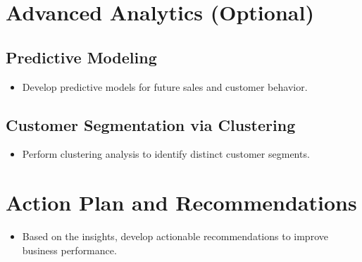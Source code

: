 \documentclass{article}
\begin{document}
\section{Advanced Analytics (Optional)}
    \subsection{Predictive Modeling}
    \begin{itemize}
        \item Develop predictive models for future sales and customer behavior.
    \end{itemize}
    
    \subsection{Customer Segmentation via Clustering}
    \begin{itemize}
        \item Perform clustering analysis to identify distinct customer segments.
    \end{itemize}

\section{Action Plan and Recommendations}
    \begin{itemize}
        \item Based on the insights, develop actionable recommendations to improve business performance.
    \end{itemize}
\end{document}
